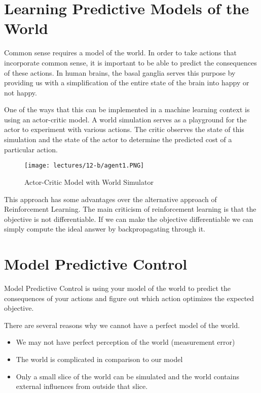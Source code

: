 \section{Learning Predictive Models of the World}

Common sense requires a model of the world. In order to take actions that incorporate common sense, it is important to be able to predict the consequences of these actions. In human brains, the basal ganglia serves this purpose by providing us with a simplification of the entire state of the brain into happy or not happy. 

One of the ways that this can be implemented in a machine learning context is using an actor-critic model. A world simulation serves as a playground for the actor to experiment with various actions. The critic observes the state of this simulation and the state of the actor to determine the predicted cost of a particular action.

\begin{figure}[h!]
\centering
\texttt{[image: lectures/12-b/agent1.PNG]}
\caption{Actor-Critic Model with World Simulator}
\label{fig:agent}
\end{figure}

This approach has some advantages over the alternative approach of Reinforcement Learning.
The main criticism of reinforcement learning is that the objective is not differentiable. If we can make the objective differentiable we can simply compute the ideal answer by backpropagating through it.

\section{Model Predictive Control}

Model Predictive Control is using your model of the world to predict the consequences of your actions and figure out which action optimizes the expected objective.


There are several reasons why we cannot have a perfect model of the world.

\begin{itemize}
	\item We may not have perfect perception of the world (measurement error)
	\item The world is complicated in comparison to our model
	\item Only a small slice of the world can be simulated and the world contains external influences from outside that slice.
\end{itemize}

